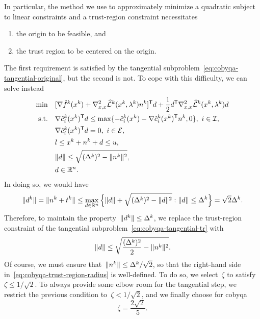 In particular, the method we use to approximately minimize a quadratic subject to linear constraints and a trust-region constraint necessitates
\begin{enumerate}
    \item the origin to be feasible, and
    \item the trust region to be centered on the origin.
\end{enumerate}
The first requirement is satisfied by the tangential subproblem~\cref{eq:cobyqa-tangential-original}, but the second is not.
To cope with this difficulty, we can solve instead
\begin{subequations}
    \label{eq:cobyqa-tangential}
    \begin{align}
        \min        & \quad [\nabla \objm[k](\iter[k]) + \nabla_{x, x}^2 \lagm[k](\iter[k], \lm[k]) \nstep[k]]^{\T} \step + \frac{1}{2} \step^{\T} \nabla_{x, x}^2 \lagm[k](\iter[k], \lm[k]) \step\\
        \text{s.t.} & \quad \nabla \conm[k]{i}(\iter[k])^{\T} \step \le \max \set{-\conm[k]{i}(\iter[k]) - \nabla \conm[k]{i}(\iter[k])^{\T} \nstep[k], 0}, ~ i \in \iub, \label{eq:cobyqa-tangential-ub}\\
                    & \quad \nabla \conm[k]{i}(\iter[k])^{\T} \step = 0, ~ i \in \ieq, \label{eq:cobyqa-tangential-eq}\\
                    & \quad \xl \le \iter[k] + \nstep[k] + \step \le \xu,\\
                    & \quad \norm{\step} \le \sqrt{(\rad[k])^2 - \norm{\nstep[k]}^2}, \label{eq:cobyqa-tangential-tr}\\
                    & \quad \step \in \R^n.
    \end{align}
\end{subequations}
In doing so, we would have
\begin{equation*}
    \norm{\step[k]} = \norm{\nstep[k] + \tstep[k]} \le \max_{d \in \R^n} \set[\Big]{\norm{d} + \sqrt{(\rad[k])^2 - \norm{\step}^2} : \norm{d} \le \rad[k]} = \sqrt{2} \rad[k].
\end{equation*}
Therefore, to maintain the property~$\norm{\step[k]} \le \rad[k]$, we replace the trust-region constraint of the tangential subproblem~\cref{eq:cobyqa-tangential-tr} with
\begin{equation}
    \label{eq:cobyqa-trust-region-radius}
    \norm{\step} \le \sqrt{\frac{(\rad[k])^2}{2} - \norm{\nstep[k]}^2}.
\end{equation}
Of course, we must ensure that~$\norm{\nstep[k]} \le \rad[k] / \sqrt{2}$, so that the right-hand side in~\cref{eq:cobyqa-trust-region-radius} is well-defined.
To do so, we select~$\zeta$ to satisfy~$\zeta \le 1 / \sqrt{2}$.
To always provide some elbow room for the tangential step, we restrict the previous condition to~$\zeta < 1 / \sqrt{2}$, and we finally choose for \gls{cobyqa}
\begin{equation*}
    \zeta = \frac{2 \sqrt{2}}{5}.
\end{equation*}

